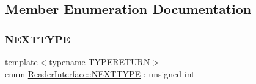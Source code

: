 \subsection{Member Enumeration Documentation}
\mbox{\label{classReaderInterface_ac2420ec8d2f60feadf2533d4fa77ec5e}} 
\subsubsection{\texorpdfstring{N\+E\+X\+T\+T\+Y\+PE}{NEXTTYPE}}
{\footnotesize\ttfamily template$<$typename T\+Y\+P\+E\+R\+E\+T\+U\+RN$>$ \\
enum \hyperlink{classReaderInterface_ac2420ec8d2f60feadf2533d4fa77ec5e}{Reader\+Interface\+::\+N\+E\+X\+T\+T\+Y\+PE} \+: unsigned int\hspace{0.3cm}{\ttfamily [strong]}}


